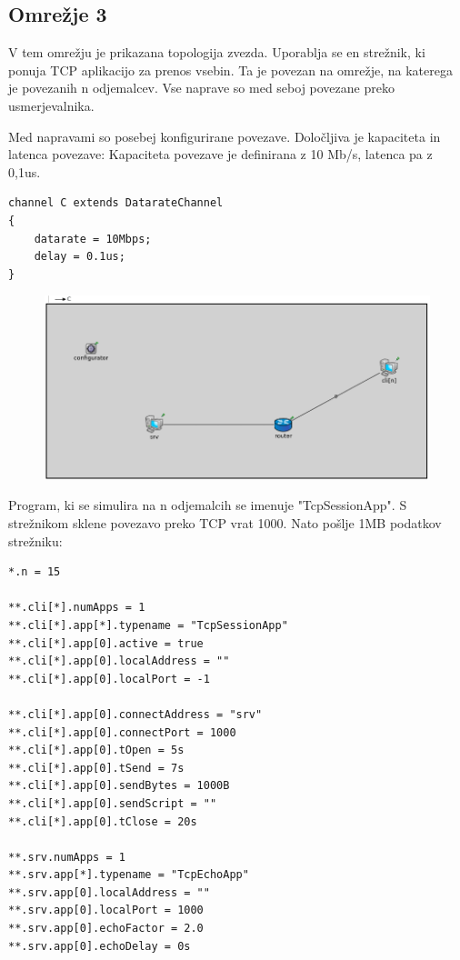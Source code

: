 \documentclass[11pt,a4paper,slovene]{myarticle}
\begin{document}
\pagebreak





\subsection{Omrežje 3}
V tem omrežju je prikazana topologija zvezda. Uporablja se en strežnik, ki ponuja TCP aplikacijo za prenos vsebin. Ta je povezan na omrežje,
na katerega je povezanih n odjemalcev. Vse naprave so med seboj povezane preko usmerjevalnika.

Med napravami so posebej konfigurirane povezave. Določljiva je kapaciteta in latenca povezave:
Kapaciteta povezave je definirana z 10 Mb/s, latenca pa z 0,1us.
\begin{lstlisting}
channel C extends DatarateChannel
{
    datarate = 10Mbps;
    delay = 0.1us;
}
\end{lstlisting}

\begin{figure}[h]
  \includegraphics[width=\linewidth]{omrezje3.png}
\end{figure}

Program, ki se simulira na n odjemalcih se imenuje "TcpSessionApp". S strežnikom sklene povezavo preko TCP vrat 1000. Nato pošlje 1MB podatkov strežniku:
\begin{lstlisting}
*.n = 15

**.cli[*].numApps = 1
**.cli[*].app[*].typename = "TcpSessionApp"
**.cli[*].app[0].active = true
**.cli[*].app[0].localAddress = ""
**.cli[*].app[0].localPort = -1

**.cli[*].app[0].connectAddress = "srv"
**.cli[*].app[0].connectPort = 1000
**.cli[*].app[0].tOpen = 5s
**.cli[*].app[0].tSend = 7s
**.cli[*].app[0].sendBytes = 1000B
**.cli[*].app[0].sendScript = ""
**.cli[*].app[0].tClose = 20s

**.srv.numApps = 1
**.srv.app[*].typename = "TcpEchoApp"
**.srv.app[0].localAddress = ""
**.srv.app[0].localPort = 1000
**.srv.app[0].echoFactor = 2.0
**.srv.app[0].echoDelay = 0s
\end{lstlisting}
\end{document}
